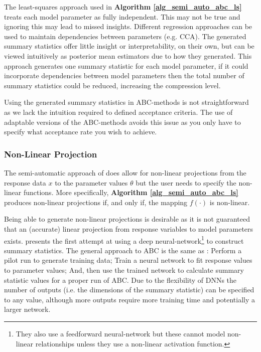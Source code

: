 \documentclass[bibliography=totoc,11pt,a4paper,margin=0]{article}
\theoremstyle{break}
\begin{document}
  \par The least-squares approach used in \textbf{Algorithm \ref{alg_semi_auto_abc_ls}} treats each model parameter as fully independent. This may not be true and ignoring this may lead to missed insights. Different regression approaches can be used to maintain dependencies between parameters (e.g. CCA). The generated summary statistics offer little insight or interpretability, on their own, but can be viewed intuitively as posterior mean estimators due to how they generated. This approach generates one summary statistic for each model parameter, if it could incorporate dependencies between model parameters then the total number of summary statistics could be reduced, increasing the compression level.

  \par Using the generated summary statistics in ABC-methods is not straightforward as we lack the intuition required to defined acceptance criteria. The use of adaptable versions of the ABC-methods avoids this issue as you only have to specify what acceptance rate you wish to achieve.


\subsubsection{Non-Linear Projection}\label{sec_non_linear_projection}

  The semi-automatic approach of \cite[]{constructing_summary_statistics_for_approximate_bayesian_computation_semi_automatic_ABC} does allow for non-linear projections from the response data $x$ to the parameter values $\theta$ but the user needs to specify the non-linear functions. More specifically, \textbf{Algorithm \ref{alg_semi_auto_abc_ls}} produces non-linear projections if, and only if, the mapping $f(\cdot)$ is non-linear.

  \par Being able to generate non-linear projections is desirable as it is not guaranteed that an (accurate) linear projection from response variables to model parameters exists. \cite[]{learning_summary_statistics_for_abc_via_dnn} presents the first attempt at using a deep neural-network\footnote{They also use a feedforward neural-network but these cannot model non-linear relationships unless they use a non-linear activation function.} to construct summary statistics. The general approach to ABC is the same as \cite[]{constructing_summary_statistics_for_approximate_bayesian_computation_semi_automatic_ABC}: Perform a pilot run to generate training data; Train a neural network to fit response values to parameter values; And, then use the trained network to calculate summary statistic values for a proper run of ABC. Due to the flexibility of DNNs the number of outputs (i.e. the dimensions of the summary statistic) can be specified to any value, although more outputs require more training time and potentially a larger network.
\end{document}
